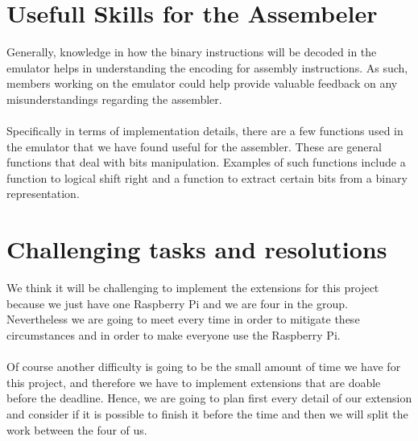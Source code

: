 \documentclass[a4paper]{article}
\begin{document}
\section{Usefull Skills for the Assembeler}
Generally, knowledge in how the binary instructions will be decoded in the emulator helps in understanding the encoding for assembly instructions. As such, members working on the emulator could help provide valuable feedback on any misunderstandings regarding the assembler.
\\\\
Specifically in terms of implementation details, there are a few functions used in the emulator that we have found useful for the assembler. These are general functions that deal with bits manipulation. Examples of such functions include a function to logical shift right and a function to extract certain bits from a binary representation.

\section{Challenging tasks and resolutions}
We think it will be challenging to implement the extensions for this project because we just have one Raspberry Pi and we are four in the group. Nevertheless we are going to meet every time in order to mitigate these circumstances and in order to make everyone use the Raspberry Pi.
\\\\
Of course another difficulty is going to be the small amount of time we have for this project, and therefore we have to implement extensions that are doable before the deadline. Hence, we are going to plan first every detail of our extension and consider if it is possible to finish it before the time and then we will split the work between the four of us.
\end{document}
